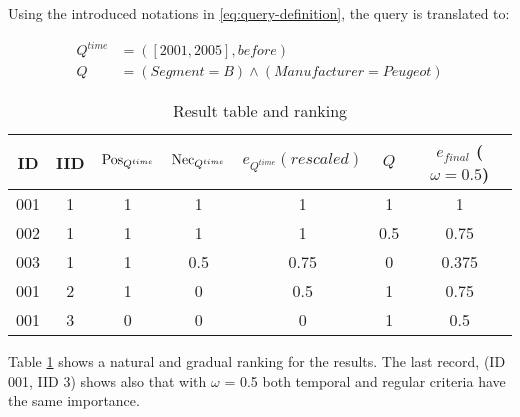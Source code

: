 \begin{example}
Using the introduced notations in \eqref{eq:query-definition}, the query is translated to: %

%
%
%


\begin{align}
Q^{time} & = \left(\left[ 2001, 2005 \right], before\right) \\
Q & = \left(Segment =  B\right) \wedge \left(Manufacturer = Peugeot\right)
\end{align}


\begin{table}[ht]
\caption{Result table and ranking}
\centering
\begin{tabular}{c c c c c c c}
\hline
ID & IID &  $\operatorname{Pos}_{Q^{time}}$ & $\operatorname{Nec}_{Q^{time}}$ & $e_{Q^{time}} (rescaled)$ & $Q$ & $e_{final}$ ($\omega=0.5$) \\ [0.5ex]
\hline
001 & 1 & 1 &  1 & 1 & 1 & 1 \\
002 & 1 & 1 & 1 & 1 & 0.5 & 0.75 \\
003 & 1 & 1 & 0.5 & 0.75 &0 & 0.375\\
001 & 2 & 1 & 0 & 0.5 &1 & 0.75 \\
001 & 3 & 0 & 0 & 0 &1 & 0.5\\
\hline
\end{tabular}
\label{tb:results}
\end{table}


Table \ref{tb:results} shows a natural and gradual ranking for the results. The last record, (ID 001, IID 3) shows also that with $\omega$ = 0.5 both temporal and regular criteria have the same importance.%

\end{example}
